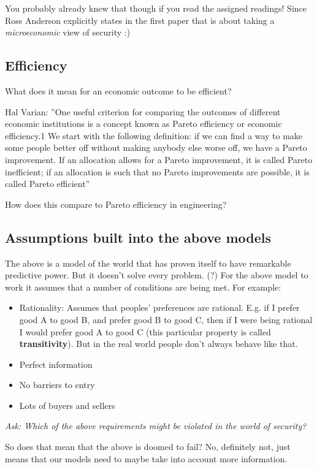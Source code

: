 \documentclass[11pt]{article}
\begin{document}
You probably already knew that though if you read the assigned readings! Since Ross Anderson explicitly states in the first paper that is about taking a {\it microeconomic} view of security :) 

\subsection{Efficiency}

What does it mean for an economic outcome to be efficient?


Hal Varian: 
''One useful criterion for comparing the outcomes of different economic institutions is a concept known as Pareto efficiency or economic efficiency.1 We
start with the following definition: if we can find a way to make some people
better off without making anybody else worse off, we have a Pareto improvement. If an allocation allows for a Pareto improvement, it is called
Pareto inefficient; if an allocation is such that no Pareto improvements
are possible, it is called Pareto efficient''

How does this compare to Pareto efficiency in engineering?

\subsection{Assumptions built into the above models}

The above is a model of the world that has proven itself to have remarkable predictive power.
But it doesn't solve every problem. (?)
For the above model to work it assumes that a number of conditions are being met. For example:

\begin{itemize}
    \item Rationality: Assumes that peoples' preferences are rational. E.g. if I prefer good A to good B, and prefer good B to good C, then if I were being rational I would prefer good A to good C (this particular property is called {\bf transitivity}). But in the real world people don't always behave like that.
    \item Perfect information
    \item No barriers to entry
    \item Lots of buyers and sellers
\end{itemize}


{\it Ask: Which of the above requirements might be violated in the world of security?}


So does that mean that the above is doomed to fail? No, definitely not, just means that our models need to maybe take into account more information.
\end{document}
